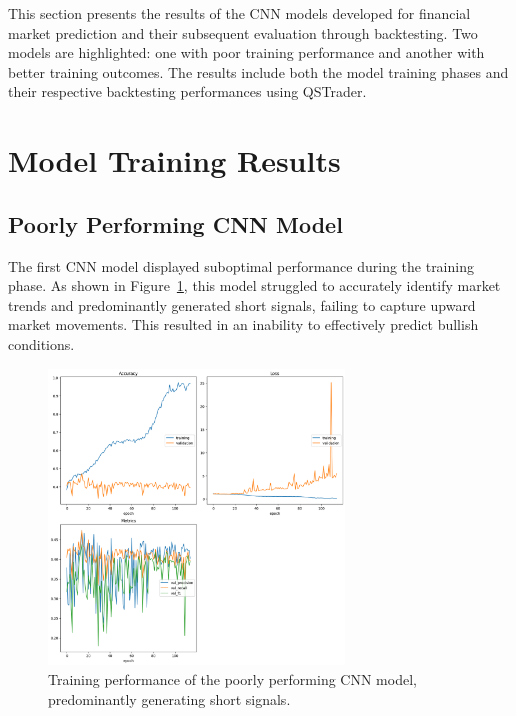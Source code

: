 \thesisspacing %

This section presents the results of the CNN models developed for financial market prediction and their subsequent evaluation through backtesting. Two models are highlighted: one with poor training performance and another with better training outcomes. The results include both the model training phases and their respective backtesting performances using QSTrader.

\section{Model Training Results}

\subsection{Poorly Performing CNN Model}

The first CNN model displayed suboptimal performance during the training phase. As shown in Figure~\ref{fig:poor_model_training}, this model struggled to accurately identify market trends and predominantly generated short signals, failing to capture upward market movements. This resulted in an inability to effectively predict bullish conditions.

\begin{figure}[h!]
    \centering
    \includegraphics[width=0.7\textwidth]{chapters/Chap3/CNN_Fail_Training.png}
    \caption{Training performance of the poorly performing CNN model, predominantly generating short signals.}
    \label{fig:poor_model_training}
\end{figure}

